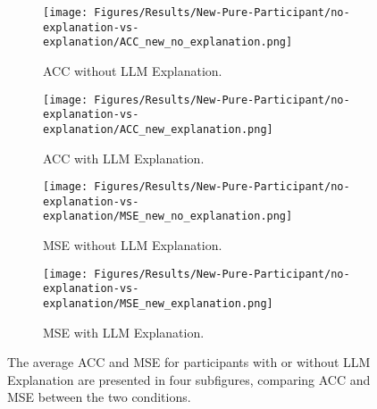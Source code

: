 
\begin{figure*}
    \centering
    \begin{subfigure}{0.48\textwidth}
     \texttt{[image: Figures/Results/New-Pure-Participant/no-explanation-vs-explanation/ACC\_new\_no\_explanation.png]}
    \caption{ACC without LLM Explanation.}
    \label{fig:new-lineplot-acc-no-exp}
  \end{subfigure}
  \hfill
  \begin{subfigure}{0.48\textwidth}
    \texttt{[image: Figures/Results/New-Pure-Participant/no-explanation-vs-explanation/ACC\_new\_explanation.png]}
    \caption{ACC with LLM Explanation.}
    \label{fig:new-lineplot-acc-exp}
  \end{subfigure}
  \begin{subfigure}{0.48\textwidth}
     \texttt{[image: Figures/Results/New-Pure-Participant/no-explanation-vs-explanation/MSE\_new\_no\_explanation.png]}
    \caption{MSE without LLM Explanation.}
    \label{fig:new-lineplot-mse-no-exp}
  \end{subfigure}
  \hfill
  \begin{subfigure}{0.48\textwidth}
    \texttt{[image: Figures/Results/New-Pure-Participant/no-explanation-vs-explanation/MSE\_new\_explanation.png]}
    \caption{MSE with LLM Explanation.}
    \label{fig:new-lineplot-mse-exp}
  \end{subfigure}
  \caption{The average ACC and MSE for participants with or without LLM Explanation are presented in four subfigures, comparing ACC and MSE between the two conditions.}
  \label{fig:average-acc-mse-llm-explanation-performance-new}
\end{figure*}

